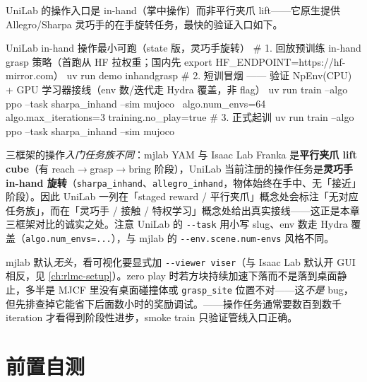 UniLab 的操作入口是 in-hand（掌中操作）而非平行夹爪 lift——它原生提供 Allegro/Sharpa 灵巧手的在手旋转任务，最快的验证入口如下。

\begin{codebox}[bash]{UniLab in-hand 操作最小可跑（state 版，灵巧手旋转）}
# 1. 回放预训练 in-hand grasp 策略（首跑从 HF 拉权重；国内先 export HF_ENDPOINT=https://hf-mirror.com）
uv run demo inhandgrasp
# 2. 短训冒烟 —— 验证 NpEnv(CPU) + GPU 学习器接线（env 数/迭代走 Hydra 覆盖，非 flag）
uv run train --algo ppo --task sharpa_inhand --sim mujoco \
    algo.num_envs=64 algo.max_iterations=3 training.no_play=true
# 3. 正式起训
uv run train --algo ppo --task sharpa_inhand --sim mujoco
\end{codebox}

\begin{note}
三框架的操作\emph{入门任务族不同}：mjlab YAM 与 Isaac Lab Franka 是\textbf{平行夹爪 lift cube}（有 reach$\to$grasp$\to$bring 阶段），UniLab 当前注册的操作任务是\textbf{灵巧手 in-hand 旋转}（\verb|sharpa_inhand|、\verb|allegro_inhand|，物体始终在手中、无「接近」阶段）。因此 UniLab 一列在「staged reward / 平行夹爪」概念处会标注「无对应任务族」，而在「灵巧手 / 接触 / 特权学习」概念处给出真实接线——这正是本章三框架对比的诚实之处。注意 UniLab 的 \verb|--task| 用小写 slug、env 数走 Hydra 覆盖（\verb|algo.num_envs=...|），与 mjlab 的 \verb|--env.scene.num-envs| 风格不同。
\end{note}

\begin{note}
mjlab 默认\emph{无头}，看可视化要显式加 \verb|--viewer viser|（与 Isaac Lab 默认开 GUI 相反，见 \cref{ch:rlmc-setup}）。zero play 时若方块持续加速下落而不是落到桌面静止，多半是 MJCF 里没有桌面碰撞体或 \verb|grasp_site| 位置不对——这\emph{不是} bug，但先排查掉它能省下后面数小时的奖励调试。——操作任务通常要数百到数千 iteration 才看得到阶段性进步，smoke train 只验证管线入口正确。
\end{note}

\section*{前置自测}
\label{sec:rlmc-manip-pretest}

